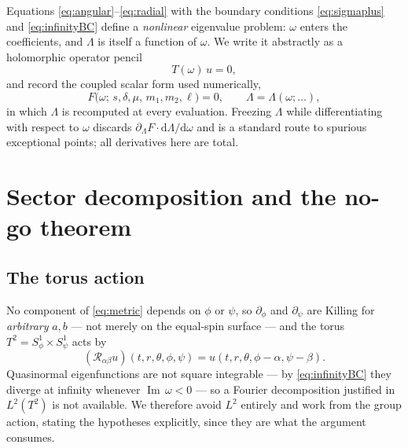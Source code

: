 \documentclass[aps,prd,reprint,superscriptaddress,nofootinbib,longbibliography]{revtex4-2}
\theoremstyle{plain}
\theoremstyle{definition}
\theoremstyle{remark}
\newcommand{\Imm}{\operatorname{Im}}
\newcommand{\dd}{\mathrm{d}}
\begin{document}
Equations \eqref{eq:angular}--\eqref{eq:radial} with the boundary conditions
\eqref{eq:sigmaplus} and \eqref{eq:infinityBC} define a \emph{nonlinear}
eigenvalue problem: $\omega$ enters the coefficients, and $\Lambda$ is itself a
function of $\omega$. We write it abstractly as a holomorphic operator pencil
\begin{equation}\label{eq:pencil}
  T(\omega)\,u = 0 ,
\end{equation}
and record the coupled scalar form used numerically,
\begin{equation}\label{eq:Fdef}
  F\big(\omega;\,s,\delta,\mu,\,m_1,m_2,\ell\big)=0,
  \qquad \Lambda=\Lambda(\omega;\dots),
\end{equation}
in which $\Lambda$ is recomputed at every evaluation. Freezing $\Lambda$ while
differentiating with respect to $\omega$ discards
$\partial_\Lambda F\cdot\dd\Lambda/\dd\omega$ and is a standard route to
spurious exceptional points; all derivatives here are total.

\section{Sector decomposition and the no-go theorem}\label{sec:nogo}

\subsection{The torus action}\label{sec:nogo:torus}

No component of \eqref{eq:metric} depends on $\phi$ or $\psi$, so
$\partial_\phi$ and $\partial_\psi$ are Killing for \emph{arbitrary} $a,b$ ---
not merely on the equal-spin surface --- and the torus
$T^2=S^1_\phi\times S^1_\psi$ acts by
\begin{equation}\label{eq:torusaction}
  (\mathcal{R}_{\alpha\beta}u)(t,r,\theta,\phi,\psi)
  = u(t,r,\theta,\phi-\alpha,\psi-\beta).
\end{equation}
Quasinormal eigenfunctions are not square integrable --- by
\eqref{eq:infinityBC} they diverge at infinity whenever $\Imm\,\omega<0$ --- so
a Fourier decomposition justified in $L^2(T^2)$ is not available. We therefore
avoid $L^2$ entirely and work from the group action, stating the hypotheses
explicitly, since they are what the argument consumes.
\end{document}
